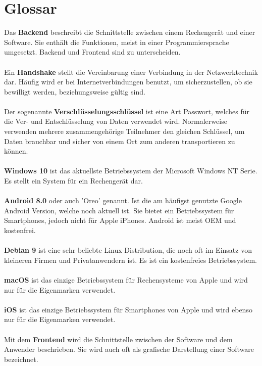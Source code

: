 \section{Glossar}
Das \textbf{Backend} beschreibt die Schnittstelle zwischen einem Rechengerät und einer Software. Sie enthält die Funktionen, meist in einer Programmiersprache umgesetzt. Backend und Frontend sind zu unterscheiden.
\\
\\
Ein \textbf{Handshake} stellt die Vereinbarung einer Verbindung in der Netzwerktechnik dar. Häufig wird er bei Internetverbindungen benutzt, um sicherzustellen, ob sie bewilligt werden, beziehungsweise gültig sind.
\\
\\
Der sogenannte \textbf{Verschlüsselungsschlüssel} ist eine Art Passwort, welches für die Ver- und Entschlüsselung von Daten verwendet wird. Normalerweise verwenden mehrere zusammengehörige Teilnehmer den gleichen Schlüssel, um Daten brauchbar und sicher von einem Ort zum anderen transportieren zu können.
\\
\\
\textbf{Windows 10} ist das aktuellste Betriebssystem der Microsoft Windows NT Serie. Es stellt ein System für ein Rechengerät dar.
\\
\\
\textbf{Android 8.0} oder auch 'Oreo' genannt. Ist die am häufigst genutzte Google Android Version, welche noch aktuell ist. Sie bietet ein Betriebssystem für Smartphones, jedoch nicht für Apple iPhones. Android ist meist OEM und kostenfrei.
\\
\\
\textbf{Debian 9} ist eine sehr beliebte Linux-Distribution, die noch oft im Einsatz von kleineren Firmen und Privatanwendern ist. Es ist ein kostenfreies Betriebssystem.
\\
\\
\textbf{macOS} ist das einzige Betriebssystem für Rechensysteme von Apple und wird nur für die Eigenmarken verwendet.
\\
\\
\textbf{iOS} ist das einzige Betriebssystem für Smartphones von Apple und wird ebenso nur für die Eigenmarken verwendet.
\\
\\
Mit dem \textbf{Frontend} wird die Schnittstelle zwischen der Software und dem Anwender beschrieben. Sie wird auch oft als grafische Darstellung einer Software bezeichnet.
\\
